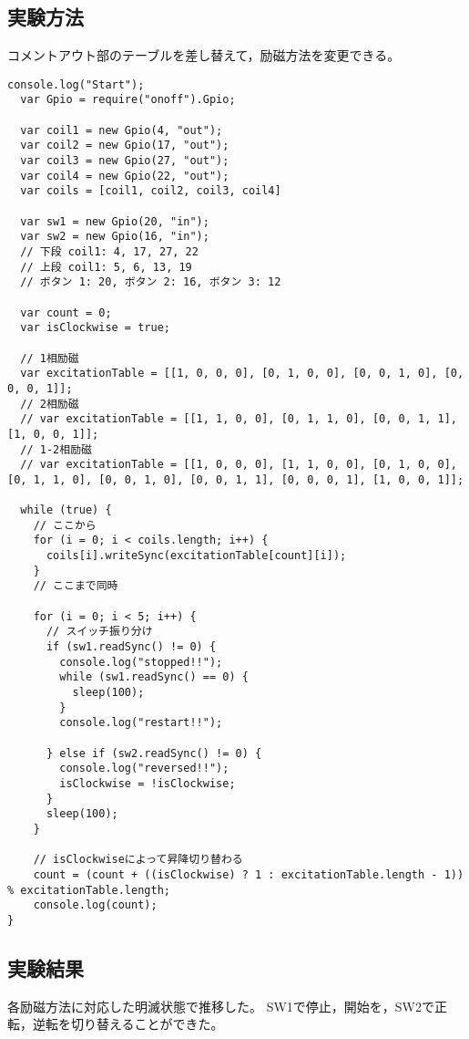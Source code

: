 \documentclass[a4paper,10pt]{jsarticle}
\begin{document}
\subsection{実験方法}
コメントアウト部のテーブルを差し替えて，励磁方法を変更できる。

\begin{lstlisting}[caption={program3-4},label={program3-4}]
  console.log("Start");
  var Gpio = require("onoff").Gpio;

  var coil1 = new Gpio(4, "out");
  var coil2 = new Gpio(17, "out");
  var coil3 = new Gpio(27, "out");
  var coil4 = new Gpio(22, "out");
  var coils = [coil1, coil2, coil3, coil4]

  var sw1 = new Gpio(20, "in");
  var sw2 = new Gpio(16, "in");
  // 下段 coil1: 4, 17, 27, 22
  // 上段 coil1: 5, 6, 13, 19
  // ボタン 1: 20, ボタン 2: 16, ボタン 3: 12

  var count = 0;
  var isClockwise = true;

  // 1相励磁
  var excitationTable = [[1, 0, 0, 0], [0, 1, 0, 0], [0, 0, 1, 0], [0, 0, 0, 1]];
  // 2相励磁
  // var excitationTable = [[1, 1, 0, 0], [0, 1, 1, 0], [0, 0, 1, 1], [1, 0, 0, 1]];
  // 1-2相励磁
  // var excitationTable = [[1, 0, 0, 0], [1, 1, 0, 0], [0, 1, 0, 0], [0, 1, 1, 0], [0, 0, 1, 0], [0, 0, 1, 1], [0, 0, 0, 1], [1, 0, 0, 1]];

  while (true) {
    // ここから
    for (i = 0; i < coils.length; i++) {
      coils[i].writeSync(excitationTable[count][i]);
    }
    // ここまで同時

    for (i = 0; i < 5; i++) {
      // スイッチ振り分け
      if (sw1.readSync() != 0) {
        console.log("stopped!!");
        while (sw1.readSync() == 0) {
          sleep(100);
        }
        console.log("restart!!");

      } else if (sw2.readSync() != 0) {
        console.log("reversed!!");
        isClockwise = !isClockwise;
      }
      sleep(100);
    }

    // isClockwiseによって昇降切り替わる
    count = (count + ((isClockwise) ? 1 : excitationTable.length - 1)) % excitationTable.length;
    console.log(count);
}

\end{lstlisting}

\subsection{実験結果}
各励磁方法に対応した明滅状態で推移した。
SW1で停止，開始を，SW2で正転，逆転を切り替えることができた。
\end{document}

